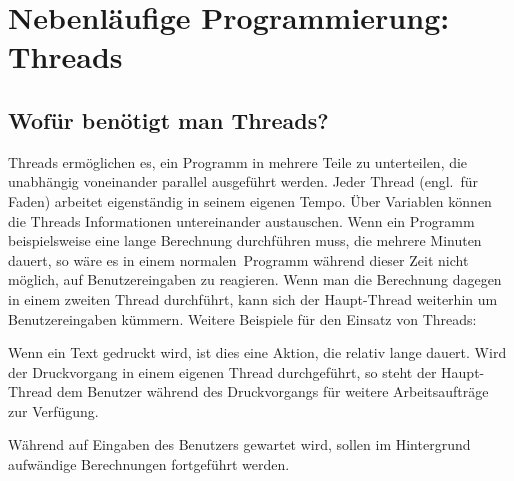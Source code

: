 \chapter{Nebenläufige Programmierung: Threads}
\renewcommand{\chaptertitle}{Nebenläufige Programmierung: Threads}

\lehead[]{\normalfont\sffamily\hspace*{-2.00cm}\textcolor{white}{\colorbox{lightblue}{\makebox[1.60cm][r]{\thechapter}}}\hspace{0.17cm}\textcolor{lightblue}{\chaptertitle}}
\rohead[]{\textcolor{lightblue}{\chaptertitle}\normalfont\sffamily\hspace*{0.17cm}\textcolor{white}{\colorbox{lightblue}{\makebox[1.60cm][l]{\thechapter}}}\hspace{-2.00cm}}
\rehead[]{\textcolor{lightblue}{AvHG, Inf, My}}
\lohead[]{\textcolor{lightblue}{AvHG, Inf, My}}

\lstset{style=myJava}

\section{Wofür benötigt man Threads?}

Threads ermöglichen es, ein Programm in mehrere Teile zu unterteilen, die
unabhängig voneinander parallel ausgeführt werden. Jeder Thread (engl.\ für
Faden) arbeitet eigenständig in seinem eigenen Tempo. Über Variablen können die
Threads Informationen untereinander austauschen. Wenn ein Programm
beispielsweise eine lange Berechnung durchführen muss, die mehrere Minuten
dauert, so wäre es in einem \glqq normalen\grqq\ Programm während dieser Zeit
nicht möglich, auf Benutzereingaben zu reagieren. Wenn man die Berechnung dagegen
in einem zweiten Thread durchführt, kann sich der Haupt-Thread weiterhin um
Benutzereingaben kümmern. Weitere Beispiele für den Einsatz von Threads:

\begin{compactitem}
\item Wenn ein Text gedruckt wird, ist dies eine Aktion, die relativ lange
dauert. Wird der Druckvorgang in einem eigenen Thread durchgeführt, so steht der
Haupt-Thread dem Benutzer während des Druckvorgangs für weitere Arbeitsaufträge
zur Verfügung.

\item Während auf Eingaben des Benutzers gewartet wird, sollen im Hintergrund
aufwändige Berechnungen fortgeführt werden.
\end{compactitem}

